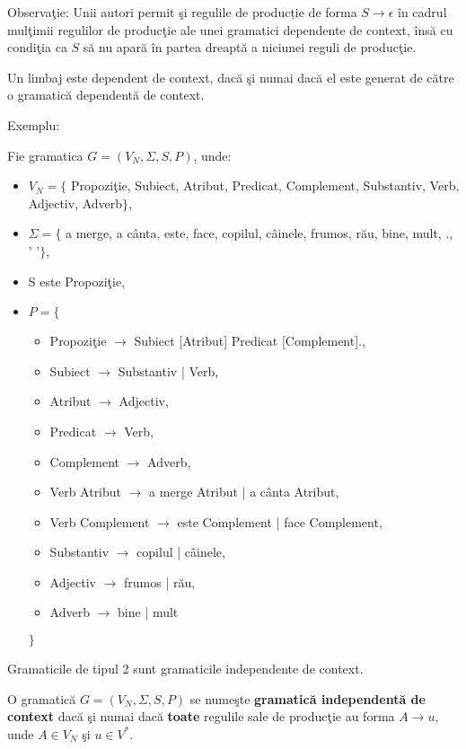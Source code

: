 Observaţie: Unii autori permit şi regulile de producție de forma $S \rightarrow \epsilon$ în cadrul mulţimii regulilor de producţie ale unei gramatici dependente de context, însă cu condiţia ca $S$ să nu apară în partea dreaptă a niciunei reguli de producţie.

Un limbaj este dependent de context, dacă şi numai dacă el este generat de către o gramatică dependentă de context.

Exemplu: 

Fie gramatica $G = (V_{N}, \Sigma, S, P )$, unde:

\begin{itemize}
\item
$V_{N} = \{$ Propoziţie, Subiect, Atribut, Predicat, Complement, Substantiv, Verb, Adjectiv, Adverb$\}$,
\item
$\Sigma = \{$ a merge, a cânta, este, face, copilul, câinele, frumos, rău, bine, mult, ., ' '$\}$,
\item
S este Propoziţie,
\item
$P = \{$
\begin{itemize}
\item
Propoziţie $\rightarrow$ Subiect [Atribut] Predicat [Complement].,
\item
Subiect $\rightarrow$ Substantiv | Verb,
\item
Atribut $\rightarrow$ Adjectiv,
\item
Predicat $\rightarrow$ Verb,
\item
Complement $\rightarrow$ Adverb,
\item
Verb Atribut $\rightarrow$ a merge Atribut | a cânta Atribut,
\item
Verb Complement $\rightarrow$ este Complement | face Complement,
\item
Substantiv $\rightarrow$ copilul | câinele,
\item
Adjectiv $\rightarrow$ frumos | rău,
\item
Adverb $\rightarrow$ bine | mult
\end{itemize}
$\}$
\end{itemize}

Gramaticile de tipul 2 sunt gramaticile independente de context.

\begin{definitie}
O gramatică $G = (V_{N}, \Sigma, S, P )$ se numeşte \textbf{gramatică independentă de context} dacă şi numai dacă \textbf{toate} regulile sale de producţie au forma $A \rightarrow u$, unde $A \in V_{N}$ şi $u \in V^{*}$.
\end{definitie}

